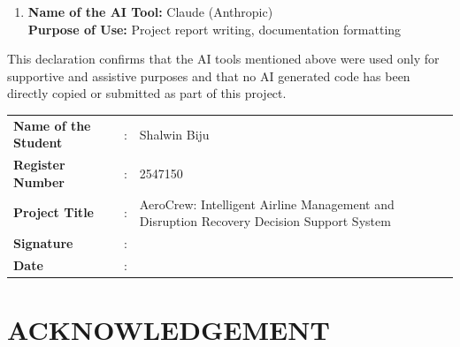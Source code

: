 \documentclass[12pt,a4paper]{report}
\begin{document}
\begin{titlepage}
{\begin{justify}
\begin{enumerate}[leftmargin=0.6cm,itemsep=0.15cm]
\item \textbf{Name of the AI Tool:} Claude (Anthropic)\\
\textbf{Purpose of Use:} Project report writing, documentation formatting

\end{enumerate}

\vspace{0.1cm}

This declaration confirms that the AI tools mentioned above were used only for supportive and assistive purposes and that no AI generated code has been directly copied or submitted as part of this project.

\end{justify}
}

\vspace{0.1cm}

\begin{flushleft}

\begin{tabular}{@{}p{5cm} c p{8cm}@{}}

\textbf{Name of the Student} & : & Shalwin Biju \\[0.4cm]

\textbf{Register Number} & : & 2547150 \\[0.4cm]

\textbf{Project Title} & : & AeroCrew: Intelligent Airline Management and Disruption Recovery Decision Support System \\[0.5cm]

\textbf{Signature} & : & \\[0.4cm]

\textbf{Date} & : & \\

\end{tabular}

\end{flushleft}

\end{titlepage}



\setcounter{page}{4}
\pagestyle{plain}
\chapter*{ACKNOWLEDGEMENT}
\end{document}
